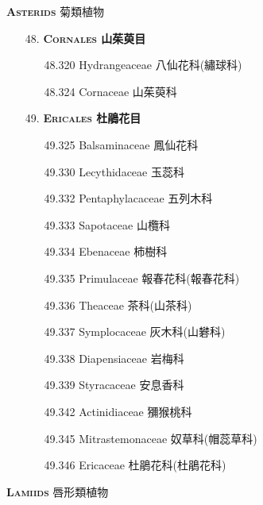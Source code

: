 \vspace{2ex} 
\noindent \normalsize\textsc{\textbf{Asterids} 菊類植物}\selectfont \\
\footnotesize\selectfont
\begin{enumerate}
  \item[48. ] \textbf{\textsc{Cornales} 山茱萸目} 
    \begin{enumerate}
      \item[48.320] Hydrangeaceae 八仙花科(繡球科)  
        
      \item[48.324] Cornaceae 山茱萸科  
        
    \end{enumerate}
  \item[49. ] \textbf{\textsc{Ericales} 杜鵑花目} 
    \begin{enumerate}
      \item[49.325] Balsaminaceae 鳳仙花科  
        
      \item[49.330] Lecythidaceae 玉蕊科  
        
      \item[49.332] Pentaphylacaceae 五列木科  
        
      \item[49.333] Sapotaceae 山欖科  
        
      \item[49.334] Ebenaceae 柿樹科  
        
      \item[49.335] Primulaceae 報春花科(報春花科)  
        
      \item[49.336] Theaceae 茶科(山茶科)  
        
      \item[49.337] Symplocaceae 灰木科(山礬科)  
        
      \item[49.338] Diapensiaceae 岩梅科  
        
      \item[49.339] Styracaceae 安息香科  
        
      \item[49.342] Actinidiaceae 獼猴桃科  
        
      \item[49.345] Mitrastemonaceae 奴草科(帽蕊草科)  
        
      \item[49.346] Ericaceae 杜鵑花科(杜鵑花科)  
        
    \end{enumerate}
\end{enumerate}
\vspace{2ex} 
\noindent \normalsize\textsc{\textbf{Lamiids} 唇形類植物}\selectfont \\
